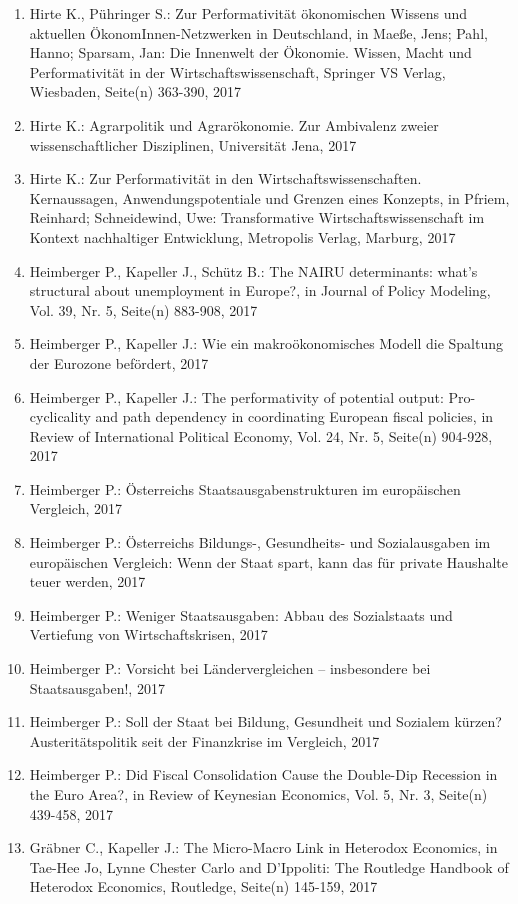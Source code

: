\begin{enumerate}
	 \item Hirte K., Pühringer S.: Zur Performativität ökonomischen Wissens und aktuellen ÖkonomInnen-Netzwerken in Deutschland, in Maeße, Jens; Pahl, Hanno; Sparsam, Jan: Die Innenwelt der Ökonomie. Wissen, Macht und Performativität in der Wirtschaftswissenschaft, Springer VS Verlag, Wiesbaden, Seite(n) 363-390, 2017
	 \item Hirte K.: Agrarpolitik und Agrarökonomie. Zur Ambivalenz zweier wissenschaftlicher Disziplinen, Universität Jena, 2017
	 \item Hirte K.: Zur Performativität in den Wirtschaftswissenschaften. Kernaussagen, Anwendungspotentiale und Grenzen eines Konzepts, in Pfriem, Reinhard; Schneidewind, Uwe: Transformative Wirtschaftswissenschaft im Kontext nachhaltiger Entwicklung, Metropolis Verlag, Marburg, 2017
	 \item Heimberger P., Kapeller J., Schütz B.: The NAIRU determinants: what’s structural about unemployment in Europe?, in Journal of Policy Modeling, Vol. 39, Nr. 5, Seite(n) 883-908, 2017
	 \item Heimberger P., Kapeller J.: Wie ein makroökonomisches Modell die Spaltung der Eurozone befördert, 2017
	 \item Heimberger P., Kapeller J.: The performativity of potential output: Pro-cyclicality and path dependency in coordinating European fiscal policies, in Review of International Political Economy, Vol. 24, Nr. 5, Seite(n) 904-928, 2017
	 \item Heimberger P.: Österreichs Staatsausgabenstrukturen im europäischen Vergleich, 2017
	 \item Heimberger P.: Österreichs Bildungs-, Gesundheits- und Sozialausgaben im europäischen Vergleich: Wenn der Staat spart, kann das für private Haushalte teuer werden, 2017
	 \item Heimberger P.: Weniger Staatsausgaben: Abbau des Sozialstaats und Vertiefung von Wirtschaftskrisen, 2017
	 \item Heimberger P.: Vorsicht bei Ländervergleichen – insbesondere bei Staatsausgaben!, 2017
	 \item Heimberger P.: Soll der Staat bei Bildung, Gesundheit und Sozialem kürzen? Austeritätspolitik seit der Finanzkrise im Vergleich, 2017
	 \item Heimberger P.: Did Fiscal Consolidation Cause the Double-Dip Recession in the Euro Area?, in Review of Keynesian Economics, Vol. 5, Nr. 3, Seite(n) 439-458, 2017
	 \item Gräbner C., Kapeller J.: The Micro-Macro Link in Heterodox Economics, in Tae-Hee Jo, Lynne Chester Carlo and D'Ippoliti: The Routledge Handbook of Heterodox Economics, Routledge, Seite(n) 145-159, 2017

\end{enumerate}
